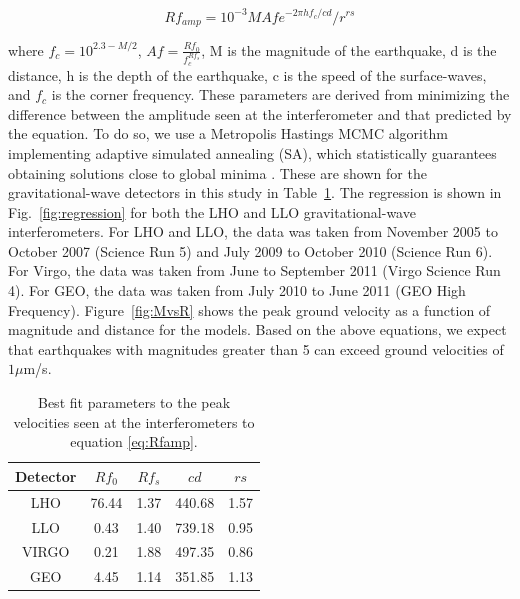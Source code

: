 \documentclass[reprint, prl, aps, showpacs]{revtex4-1}
\begin{document}
\begin{equation}
Rf_{amp} = 10^{-3} M Af e^{-2 \pi h f_c/cd}/r^{rs}
\label{eq:Rfamp}
\end{equation}

where $f_c = 10^{2.3-M/2}$, $Af = \frac{Rf_0}{f_c^{Rf_s}}$, M is the magnitude of the earthquake, d is the distance, h is the depth of the earthquake, c is the speed of the surface-waves, and $f_{c}$ is the corner frequency. 
These parameters are derived from minimizing the difference between the amplitude seen at the interferometer and that predicted by the equation. 
To do so, we use a Metropolis Hastings MCMC algorithm implementing adaptive simulated annealing (SA), which statistically guarantees obtaining solutions close to global minima \cite{KiGe1983,In2000}.
These are shown for the gravitational-wave detectors in this study in Table~\ref{table:fit}. The regression is shown in Fig.~\ref{fig:regression} for both the LHO and LLO gravitational-wave interferometers. 
For LHO and LLO, the data was taken from November 2005 to October 2007 (Science Run 5) and July 2009 to October 2010 (Science Run 6).
For Virgo, the data was taken from June to September 2011 (Virgo Science Run 4).
For GEO, the data was taken from July 2010 to June 2011 (GEO High Frequency).
Figure~\ref{fig:MvsR} shows the peak ground velocity as a function of magnitude and distance for the models. Based on the above equations, we expect that earthquakes with magnitudes greater than 5 can exceed ground velocities of $1 \mu$m/s.


\begin{table}[]
\centering
\label{table:fit}
\begin{tabular}{|c|c|c|c|c|}
\hline
Detector & $Rf_0$ & $Rf_s$ & $cd$ & $rs$ \\ \hline
LHO & 76.44 & 1.37 & 440.68 & 1.57 \\ \hline
LLO & 0.43 & 1.40 & 739.18 & 0.95 \\ \hline
VIRGO & 0.21 & 1.88 & 497.35 & 0.86 \\ \hline
GEO & 4.45 & 1.14 & 351.85 & 1.13 \\ \hline
\end{tabular}
\caption{Best fit parameters to the peak velocities seen at the interferometers to equation \ref{eq:Rfamp}.}
\end{table}
\end{document}
